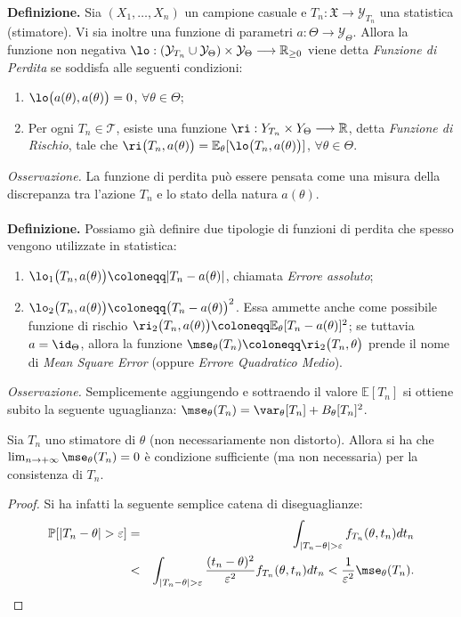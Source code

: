 \textbf{Definizione.} Sia $(X_1,\ldots,X_n)$ un campione casuale e $T_n: \mathfrak{X}\longrightarrow\mathcal{Y}_{T_n}$ una statistica (stimatore). Vi sia inoltre una funzione di parametri $a: \Theta\longrightarrow\mathcal{Y}_{\Theta}$. Allora la funzione non negativa $\lo: \left(\mathcal{Y}_{T_n}\cup\mathcal{Y}_{\Theta}\right)\times\mathcal{Y}_{\Theta}\longrightarrow \mathbb{R}_{\geq 0}$ viene detta \textit{Funzione di Perdita} se soddisfa alle seguenti condizioni:
\begin{enumerate}[noitemsep]
\item $\lo\big(a(\theta),a(\theta)\big)=0$, $\forall \theta\in \Theta$;
\item Per ogni $T_n\in \mathcal{T}$, esiste una funzione $\ri: Y_{T_n}\times Y_{\Theta}\longrightarrow \mathbb{R}$, detta \textit{Funzione di Rischio}, tale che $\ri\big(T_n,a(\theta)\big)=\mathbb{E}_{\theta}[\lo\big(T_n,a(\theta)\big)]$, $\forall \theta\in \Theta$. 
\end{enumerate}
\textit{Osservazione.} La funzione di perdita può essere pensata come una misura della discrepanza tra l'azione $T_n$ e lo stato della natura $a(\theta)$. \\ \\
\textbf{Definizione.} Possiamo già definire due tipologie di funzioni di perdita che spesso vengono utilizzate in statistica: 
\begin{enumerate}[noitemsep]
\item $\lo_1\big(T_n,a(\theta)\big)\coloneqq |T_n-a(\theta)|$, chiamata \textit{Errore assoluto};
\item $\lo_2\big(T_n,a(\theta)\big)\coloneqq \big(T_n-a(\theta)\big)^2$. Essa ammette anche come possibile funzione di rischio $\ri_2\big(T_n,a(\theta)\big)\coloneqq \mathbb{E}_{\theta}[T_n-a(\theta)]^2$; se tuttavia $a=\id_{\Theta}$, allora la funzione $\mse_{\theta}(T_n)\coloneqq \ri_2\big(T_n,\theta\big)$ prende il nome di \textit{Mean Square Error} (oppure \textit{Errore Quadratico Medio}).
\end{enumerate}
\textit{Osservazione.} Semplicemente aggiungendo e sottraendo il valore $\mathbb{E}[T_n]$ si ottiene subito la seguente uguaglianza: $\mse_{\theta}(T_n)=\var_\theta [T_n]+B_\theta [T_n]^2$.
\begin{theorem}
Sia $T_n$ uno stimatore di $\theta$ (non necessariamente non distorto). Allora si ha che $\lim_{n\rightarrow +\infty} \mse_\theta (T_n)=0$ è condizione sufficiente (ma non necessaria) per la consistenza di $T_n.$
\end{theorem}
\begin{proof} Si ha infatti la seguente semplice catena di diseguaglianze: 
\begin{eqnarray*}
\mathbb{P}[|T_n-\theta|>\varepsilon] &=& \int_{|T_n-\theta|>\varepsilon} f_{T_n}(\theta,t_n)dt_n \\ 
&<& \int_{|T_n-\theta|>\varepsilon} \frac{(t_n-\theta)^2}{\varepsilon^2}f_{T_n}(\theta,t_n)dt_n < \frac{1}{\varepsilon^2}\mse_\theta (T_n).
\end{eqnarray*}
\end{proof}
